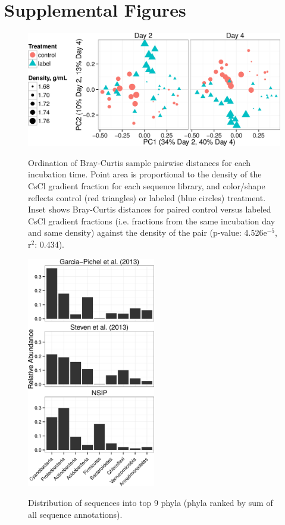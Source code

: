 \section{Supplemental Figures}
\newpage

\begin{figure}[H]
  \centering
  \caption{Ordination of Bray-Curtis sample pairwise distances for each incubation time. Point area is proportional to the density of the CsCl gradient fraction for each sequence library, and color/shape reflects control (red triangles) or labeled (blue circles) treatment. Inset shows Bray-Curtis distances for paired control versus labeled CsCl gradient fractions (i.e. fractions from the same incubation day and same density) against the density of the pair (p-value: 4.526e$^{-5}$, r$^{2}$: 0.434).}
  \includegraphics[width=1.0\textwidth]{figures/ordination_all_day_facet/ordination_all_day_facet.png}
  \label{fig:ordination}
\end{figure}

\begin{figure}[h!]
  \centering
  \caption{Distribution of sequences into top 9 phyla (phyla ranked by sum of all sequence annotations).}
    \includegraphics[width=0.5\textwidth]{figures/study_phylum_dist/study_phylum_dist.png}
  \label{fig:study_phy_dist}
\end{figure}

